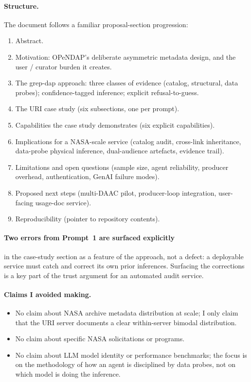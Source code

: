 \documentclass[11pt]{article}
\begin{document}
\paragraph{Structure.} The document follows a familiar
proposal-section progression:
\begin{enumerate}
  \item Abstract.
  \item Motivation: OPeNDAP's deliberate asymmetric metadata
    design, and the user / curator burden it creates.
  \item The grep-dap approach: three classes of evidence
    (catalog, structural, data probes); confidence-tagged
    inference; explicit refusal-to-guess.
  \item The URI case study (six subsections, one per prompt).
  \item Capabilities the case study demonstrates (six explicit
    capabilities).
  \item Implications for a NASA-scale service (catalog audit,
    cross-link inheritance, data-probe physical inference,
    dual-audience artefacts, evidence trail).
  \item Limitations and open questions (sample size, agent
    reliability, producer overhead, authentication, GenAI
    failure modes).
  \item Proposed next steps (multi-DAAC pilot,
    producer-loop integration, user-facing usage-doc service).
  \item Reproducibility (pointer to repository contents).
\end{enumerate}

\paragraph{Two errors from Prompt~1 are surfaced explicitly} in
the case-study section as a feature of the approach, not a
defect: a deployable service must catch and correct its own
prior inferences. Surfacing the corrections is a key part of the
trust argument for an automated audit service.

\paragraph{Claims I avoided making.}
\begin{itemize}
  \item No claim about NASA archive metadata distribution at
    scale; I only claim that the URI server documents a clear
    within-server bimodal distribution.
  \item No claim about specific NASA solicitations or programs.
  \item No claim about LLM model identity or performance
    benchmarks; the focus is on the methodology of how an agent
    is disciplined by data probes, not on which model is doing
    the inference.
\end{itemize}
\end{document}
